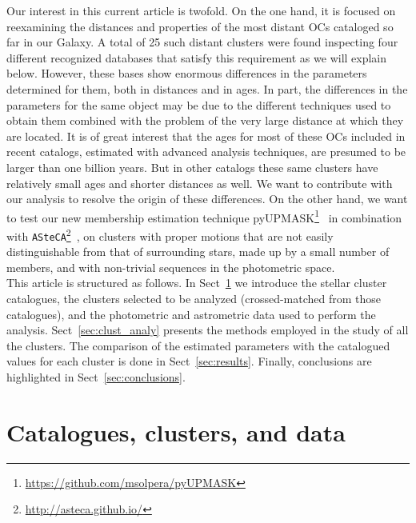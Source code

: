 \documentclass{aa}
\begin{document}
 Our interest in this current article is twofold. On the one hand, it is focused
 on reexamining the distances and properties of the most distant OCs cataloged
 so far in our Galaxy. A total of 25 such distant clusters were found
 inspecting four different recognized databases that satisfy this requirement as
 we will explain below. However, these bases show enormous differences in the
 parameters determined for them, both in distances and in ages. In part, the
 differences in the parameters for the same object may be
 due to the different techniques used to obtain them combined with the problem
 of the very large distance at which they are located.
 It is of great interest that the ages for most of these OCs included in recent
 catalogs, estimated with advanced analysis techniques, are presumed to be
 larger than one billion years. But in other catalogs these same clusters have
 relatively small ages and shorter distances as well. We want to
 contribute with our analysis to resolve the origin of these differences.
 On the other hand, we want to test our new membership estimation technique
 pyUPMASK\footnote{\url{https://github.com/msolpera/pyUPMASK}}~\citep{Pera_2021}
 in combination with
 \texttt{ASteCA}\footnote{\url{http://asteca.github.io/}}~\citep{Perren_2015},
 on clusters with proper motions that are
 not easily distinguishable from that of surrounding stars, made up by a small
 number of members, and with non-trivial sequences in the photometric space.\\


 This article is structured as follows. In Sect~\ref{sec:cat_clust_data} we
 introduce the stellar cluster catalogues, the clusters selected to be
 analyzed (crossed-matched from those catalogues), and the photometric and
 astrometric data used to perform the analysis.
 Sect~\ref{sec:clust_analy} presents the methods employed in the study of all the
 clusters. The comparison of the estimated parameters with the catalogued
 values for each cluster is done in Sect~\ref{sec:results}. Finally,
 conclusions are highlighted in Sect~\ref{sec:conclusions}.





\section{Catalogues, clusters, and data}
 \label{sec:cat_clust_data}
\end{document}
